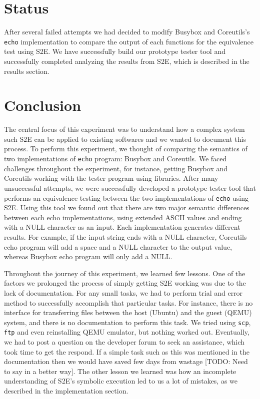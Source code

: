\documentclass[conference]{IEEEtran}
\begin{document}

\section{Status}

After several failed attempts we had decided to modify Busybox and Coreutils's {\tt echo} implementation to compare the output of each functions for the equivalence test using S2E. We have successfully build our prototype tester tool and successfully completed analyzing the results from S2E, which is described in the results section. 


\section{Conclusion}

The central focus of this experiment was to understand how a complex system such S2E can be applied to existing softwares and we wanted to document this process. To perform this experiment, we thought of comparing the semantics of two implementations of {\tt echo} program: Busybox and Coreutils. We faced challenges throughout the experiment, for instance, getting Busybox and Coreutils working with the tester program using libraries. After many unsuccessful attempts, we were successfully developed a prototype tester tool that performs an equivalence testing between the two implementations of {\tt echo} using S2E. Using this tool we found out that there are two major semantic differences between each echo implementations, using extended ASCII values and ending with a NULL character as an input. Each implementation generates different results. For example, if the input string ends with  a NULL character, Coreutils echo program will add a space and a NULL character to the output value, whereas Busybox echo program will only add a NULL. 

Throughout the journey of this experiment, we learned few lessons. One of the factors we prolonged the process of simply getting S2E working was due to the lack of documentation. For any small tasks, we had to perform trial and error method to successfully accomplish that particular tasks. For instance, there is no interface for transferring files between the host (Ubuntu) and the guest (QEMU) system, and there is no documentation to perform this task. We tried using {\tt scp}, {\tt ftp} and even reinstalling QEMU emulator, but nothing worked out. Eventually, we had to post a question on the developer forum to seek an assistance, which took time to get the respond. If a simple task such as this was mentioned in the documentation then we would have saved few days from wastage [TODO: Need to say in a better way]. The other lesson we learned was how an incomplete understanding of S2E's symbolic execution led to us a lot of mistakes, as we described in the implementation section. 
\end{document}
